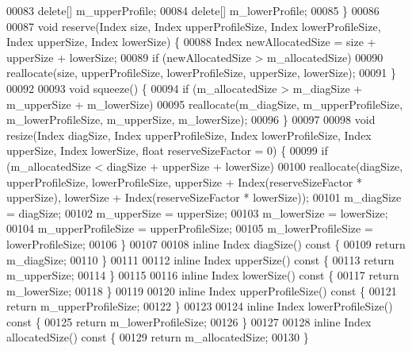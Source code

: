 \begin{DoxyCode}
00083         \textcolor{keyword}{delete}[] m\_upperProfile;
00084         \textcolor{keyword}{delete}[] m\_lowerProfile;
00085     \}
00086 
00087     \textcolor{keywordtype}{void} reserve(Index size, Index upperProfileSize, Index lowerProfileSize, Index upperSize, Index 
      lowerSize) \{
00088         Index newAllocatedSize = size + upperSize + lowerSize;
00089         \textcolor{keywordflow}{if} (newAllocatedSize > m\_allocatedSize)
00090             reallocate(size, upperProfileSize, lowerProfileSize, upperSize, lowerSize);
00091     \}
00092 
00093     \textcolor{keywordtype}{void} squeeze() \{
00094         \textcolor{keywordflow}{if} (m\_allocatedSize > m\_diagSize + m\_upperSize + m\_lowerSize)
00095             reallocate(m\_diagSize, m\_upperProfileSize, m\_lowerProfileSize, m\_upperSize, m\_lowerSize);
00096     \}
00097 
00098     \textcolor{keywordtype}{void} resize(Index diagSize, Index upperProfileSize, Index lowerProfileSize, Index upperSize, Index 
      lowerSize, \textcolor{keywordtype}{float} reserveSizeFactor = 0) \{
00099         \textcolor{keywordflow}{if} (m\_allocatedSize < diagSize + upperSize + lowerSize)
00100             reallocate(diagSize, upperProfileSize, lowerProfileSize, upperSize + Index(reserveSizeFactor * 
      upperSize), lowerSize + Index(reserveSizeFactor * lowerSize));
00101         m\_diagSize = diagSize;
00102         m\_upperSize = upperSize;
00103         m\_lowerSize = lowerSize;
00104         m\_upperProfileSize = upperProfileSize;
00105         m\_lowerProfileSize = lowerProfileSize;
00106     \}
00107 
00108     \textcolor{keyword}{inline} Index diagSize()\textcolor{keyword}{ const }\{
00109         \textcolor{keywordflow}{return} m\_diagSize;
00110     \}
00111 
00112     \textcolor{keyword}{inline} Index upperSize()\textcolor{keyword}{ const }\{
00113         \textcolor{keywordflow}{return} m\_upperSize;
00114     \}
00115 
00116     \textcolor{keyword}{inline} Index lowerSize()\textcolor{keyword}{ const }\{
00117         \textcolor{keywordflow}{return} m\_lowerSize;
00118     \}
00119 
00120     \textcolor{keyword}{inline} Index upperProfileSize()\textcolor{keyword}{ const }\{
00121         \textcolor{keywordflow}{return} m\_upperProfileSize;
00122     \}
00123 
00124     \textcolor{keyword}{inline} Index lowerProfileSize()\textcolor{keyword}{ const }\{
00125         \textcolor{keywordflow}{return} m\_lowerProfileSize;
00126     \}
00127 
00128     \textcolor{keyword}{inline} Index allocatedSize()\textcolor{keyword}{ const }\{
00129         \textcolor{keywordflow}{return} m\_allocatedSize;
00130     \}

\end{DoxyCode}
